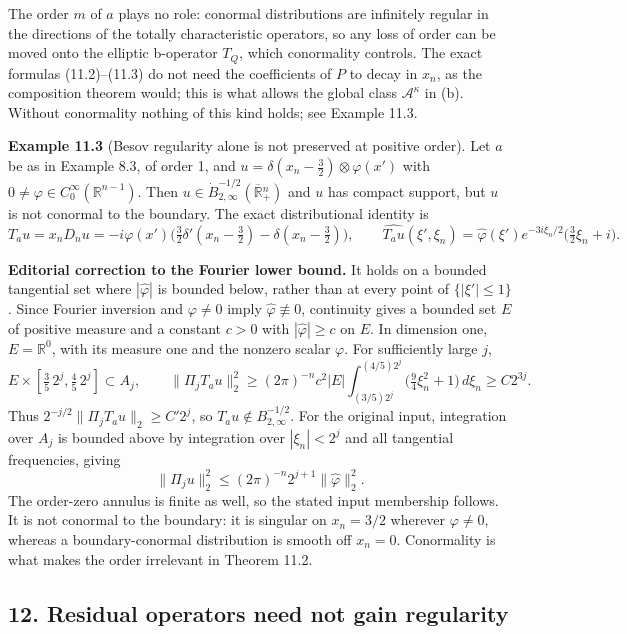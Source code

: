 \documentclass[
  11pt,
]{article}
\begin{document}
The order \(m\) of \(a\) plays no role: conormal distributions are
infinitely regular in the directions of the totally characteristic
operators, so any loss of order can be moved onto the elliptic
b-operator \(T_Q\), which conormality controls. The exact formulas
(11.2)--(11.3) do not need the coefficients of \(P\) to decay in
\(x_n\), as the composition theorem would; this is what allows the
global class \(\mathcal A^\kappa\) in (b). Without conormality nothing
of this kind holds; see Example 11.3.

\textbf{Example 11.3} (Besov regularity alone is not preserved at
positive order). Let \(a\) be as in Example 8.3, of order 1, and
\(u=\delta(x_n-\tfrac32)\otimes\varphi(x')\) with
\(0\neq\varphi\in C_0^\infty(\mathbb R^{n-1})\). Then
\(u\in\dot B^{-1/2}_{2,\infty}(\overline{\mathbb R}{}^n_+)\) and \(u\)
has compact support, but \(u\) is not conormal to the boundary. The
exact distributional identity is \[
 T_au=x_nD_nu=-i\varphi(x')\big(\tfrac32\delta'(x_n-\tfrac32)-\delta(x_n-\tfrac32)\big),
 \qquad
 \widehat{T_au}(\xi',\xi_n)
 =\widehat\varphi(\xi')e^{-3i\xi_n/2}\big(\tfrac32\xi_n+i\big).
\]

\textbf{Editorial correction to the Fourier lower bound.} It holds on a
bounded tangential set where \(|\widehat\varphi|\) is bounded below,
rather than at every point of \(\{|\xi'|\le1\}\). Since Fourier
inversion and \(\varphi\neq0\) imply \(\widehat\varphi\not\equiv0\),
continuity gives a bounded set \(E\) of positive measure and a constant
\(c>0\) with \(|\widehat\varphi|\ge c\) on \(E\). In dimension one,
\(E=\mathbb R^0\), with its measure one and the nonzero scalar
\(\varphi\). For sufficiently large \(j\), \[
 E\times[\tfrac35\,2^j,\tfrac45\,2^j]\subset A_j,
 \qquad
 \|\Pi_jT_au\|_2^2
 \ge (2\pi)^{-n}c^2|E|
       \int_{(3/5)2^j}^{(4/5)2^j}
           \big(\tfrac94\xi_n^2+1\big)\,d\xi_n
 \ge C2^{3j}.
\] Thus \(2^{-j/2}\|\Pi_jT_au\|_2\ge C'2^j\), so
\(T_au\notin B^{-1/2}_{2,\infty}\). For the original input, integration
over \(A_j\) is bounded above by integration over \(|\xi_n|<2^j\) and
all tangential frequencies, giving \[
 \|\Pi_j u\|_2^2
 \le (2\pi)^{-n}2^{j+1}\|\widehat\varphi\|_2^2.
\] The order-zero annulus is finite as well, so the stated input
membership follows. It is not conormal to the boundary: it is singular
on \(x_n=3/2\) wherever \(\varphi\neq0\), whereas a boundary-conormal
distribution is smooth off \(x_n=0\). Conormality is what makes the
order irrelevant in Theorem 11.2.

\subsection{12. Residual operators need not gain
regularity}\label{residual-operators-need-not-gain-regularity}
\end{document}
